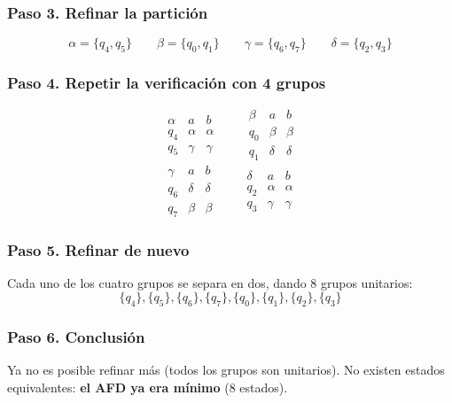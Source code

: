 \documentclass[12pt,letterpaper]{article}
\begin{document}
\begin{enumerate}[label=\arabic*.]
\begin{enumerate}
    \subsubsection*{Paso 3. Refinar la partición}
    \[
    \alpha = \{q_4,q_5\} \qquad \beta = \{q_0,q_1\} \qquad \gamma = \{q_6,q_7\} \qquad \delta = \{q_2,q_3\}
    \]

    \subsubsection*{Paso 4. Repetir la verificación con 4 grupos}
    \[
    \begin{array}{c|cc}
      \alpha & a & b \\ \hline
      q_4 & \alpha & \alpha \\
      q_5 & \gamma & \gamma
    \end{array}
    \qquad
    \begin{array}{c|cc}
      \beta & a & b \\ \hline
      q_0 & \beta & \beta \\
      q_1 & \delta & \delta
    \end{array}
    \]
    \[
    \begin{array}{c|cc}
      \gamma & a & b \\ \hline
      q_6 & \delta & \delta \\
      q_7 & \beta & \beta
    \end{array}
    \qquad
    \begin{array}{c|cc}
      \delta & a & b \\ \hline
      q_2 & \alpha & \alpha \\
      q_3 & \gamma & \gamma
    \end{array}
    \]

    \subsubsection*{Paso 5. Refinar de nuevo}
    Cada uno de los cuatro grupos se separa en dos, dando 8 grupos unitarios:
    \[
    \{q_4\},\{q_5\},\{q_6\},\{q_7\},\{q_0\},\{q_1\},\{q_2\},\{q_3\}
    \]

    \subsubsection*{Paso 6. Conclusión}
    Ya no es posible refinar más (todos los grupos son unitarios). No existen estados equivalentes: \textbf{el AFD ya era mínimo} (8 estados).


\end{enumerate}
\end{enumerate}
\end{document}
